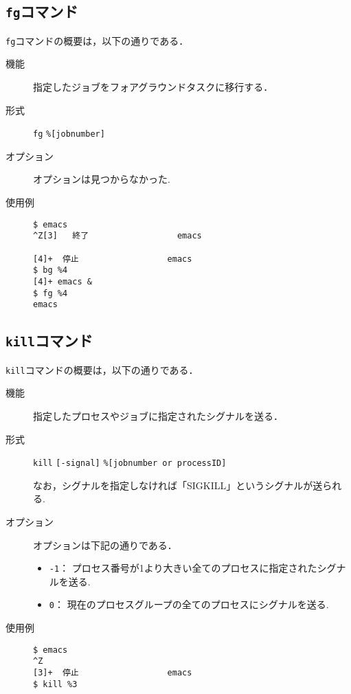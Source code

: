 \documentclass[a4j,11pt]{jarticle}
\begin{document}
\subsection{\texttt{fg}コマンド}
\verb|fg|コマンドの概要は，以下の通りである．
\begin{description}
  \item[機能]
    指定したジョブをフォアグラウンドタスクに移行する．
  \item[形式]
    \verb|fg| \verb|%|\verb|[jobnumber]|
  \item[オプション]
オプションは見つからなかった.
  \item[使用例]
    \begin{verbatim}
$ emacs
^Z[3]   終了                  emacs

[4]+  停止                  emacs
$ bg %4
[4]+ emacs &
$ fg %4
emacs
    \end{verbatim}
\end{description}

\subsection{\texttt{kill}コマンド}
\verb|kill|コマンドの概要は，以下の通りである．
\begin{description}
  \item[機能]
     指定したプロセスやジョブに指定されたシグナルを送る．
  \item[形式]
    \verb|kill| \verb|[-signal]| \verb|%|\verb|[jobnumber or processID]|

なお，シグナルを指定しなければ「SIGKILL」というシグナルが送られる.
  \item[オプション]
オプションは下記の通りである．
\begin{itemize}
      \item \verb|-1|：  プロセス番号が1より大きい全てのプロセスに指定されたシグナルを送る.
      \item \verb|0|：  現在のプロセスグループの全てのプロセスにシグナルを送る.
    \end{itemize}
  \item[使用例]
    \begin{verbatim}
$ emacs
^Z
[3]+  停止                  emacs
$ kill %3
    \end{verbatim}
\end{description}

\end{document}
